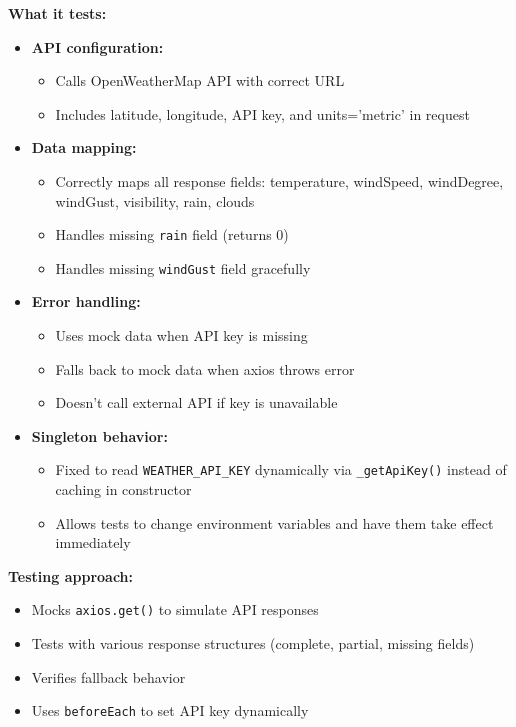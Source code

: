 \textbf{What it tests:}
\begin{itemize}
    \item \textbf{API configuration:}
    \begin{itemize}
        \item Calls OpenWeatherMap API with correct URL
        \item Includes latitude, longitude, API key, and units='metric' in request
    \end{itemize}
    
    \item \textbf{Data mapping:}
    \begin{itemize}
        \item Correctly maps all response fields: temperature, windSpeed, windDegree, windGust, visibility, rain, clouds
        \item Handles missing \texttt{rain} field (returns 0)
        \item Handles missing \texttt{windGust} field gracefully
    \end{itemize}
    
    \item \textbf{Error handling:}
    \begin{itemize}
        \item Uses mock data when API key is missing
        \item Falls back to mock data when axios throws error
        \item Doesn't call external API if key is unavailable
    \end{itemize}
    
    \item \textbf{Singleton behavior:}
    \begin{itemize}
        \item Fixed to read \texttt{WEATHER\_API\_KEY} dynamically via \texttt{\_getApiKey()} instead of caching in constructor
        \item Allows tests to change environment variables and have them take effect immediately
    \end{itemize}
\end{itemize}

\textbf{Testing approach:}
\begin{itemize}
    \item Mocks \texttt{axios.get()} to simulate API responses
    \item Tests with various response structures (complete, partial, missing fields)
    \item Verifies fallback behavior
    \item Uses \texttt{beforeEach} to set API key dynamically
\end{itemize}

